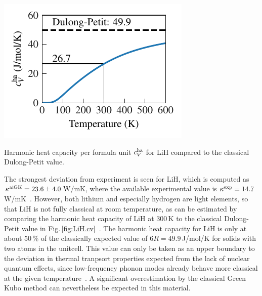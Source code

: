 \begin{marginfigure}
	\includegraphics[width=\textwidth]{./data/plots/heat_capacity/225.LiH/thermal_properties.pdf}
	\caption{Harmonic heat capacity per formula unit $c_V^{\rm ha}$ for LiH compared to the classical Dulong-Petit value.}
	\label{fig:LiH.cv}
\end{marginfigure}
%
The strongest deviation from experiment is seen for LiH, which is computed as $\kappa^{\rm aiGK} = 23.6 \pm 4.0$\,W/mK, where the available experimental value is $\kappa^{\rm exp} = 14.7$\,W/mK~\cite{Slack.1973}. However, both lithium and especially hydrogen are light elements, so that LiH is not fully classical at room temperature, as can be estimated by comparing the harmonic heat capacity of LiH at 300\,K to the classical Dulong-Petit value in Fig.\,\ref{fig:LiH.cv}~\cite{Dove}. The harmonic heat capacity for LiH is only at about 50\,\% of the classically expected value of $6 R = 49.9$\,J/mol/K for solids with two atoms in the unitcell. This value can only be taken as an upper boundary to the deviation in thermal tranpsort properties expected from the lack of nuclear quantum effects, since low-frequency phonon modes already behave more classical at the given temperature~\cite{Volz.2020,Volz.2020b}.  A significant overestimation by the classical Green Kubo method can nevertheless be expected in this material. 
